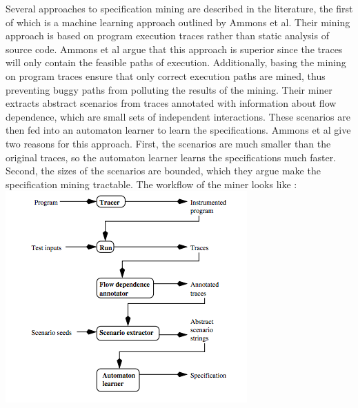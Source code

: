 \documentclass[12pt]{article}
\begin{document}
\noindent Several approaches to specification mining are described in the
literature, the first of which is a machine learning approach outlined by
Ammons et al. Their mining approach is based on program execution traces rather
than static analysis of source code. Ammons et al argue that this approach is
superior since the traces will only contain the feasible paths of execution.
Additionally, basing the mining on program traces ensure that only correct
execution paths are mined, thus preventing buggy paths from polluting the
results of the mining\cite{Ammons:2002:MS:503272.503275}. Their miner extracts
abstract scenarios from traces annotated with information about flow
dependence, which are small sets of independent interactions. These scenarios
are then fed into an automaton learner to learn the specifications. Ammons et
al give two reasons for this approach. First, the scenarios are much smaller
than the original traces, so the automaton learner learns the specifications
much faster. Second, the sizes of the scenarios are bounded, which they argue
make the specification mining tractable. The workflow of the miner looks like
\cite{Ammons:2002:MS:503272.503275}:\\
\includegraphics{machine_learning_miner_workflow.png}
\\
\end{document}
